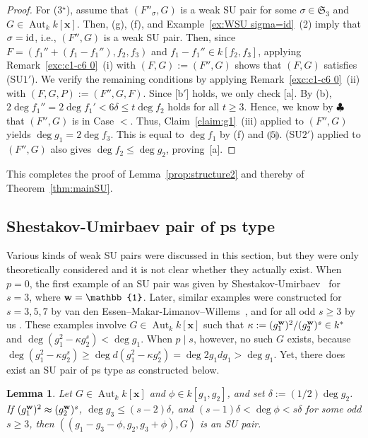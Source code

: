 \documentclass{amsart}
\theoremstyle{plain}
\newtheorem{lem}[thm]{Lemma}
\theoremstyle{definition}
\newcommand{\Aut }{\mathop{\mathrm{Aut}}\nolimits}
\newcommand{\id}{{\rm id}}
\newcommand{\x}{{\boldsymbol x}}
\newcommand{\w}{{\bf w}}
\newcommand{\kx}{k[\x]}
\newcommand{\sym}{\mathfrak{S}}
\begin{document}
\begin{proof}
For (3$^\star $), 
assume that $(F''_\sigma ,G)$ is a weak SU pair 
for some $\sigma \in \sym _3$ and $G\in \Aut _k\kx $. 
Then, 
(g), (f), and Example~\ref{ex:WSU sigma=id}~(2) 
imply that $\sigma =\id $, 
i.e., 
$(F'',G)$ is a weak SU pair. 
Then, 
since $F=(f_1''+(f_1-f_1''),f_2,f_3)$ 
and $f_1-f_1''\in k[f_2,f_3]$, 
applying Remark~\ref{exc:c1-c6 0}~(i) with $(F,G):=(F'',G)$ 
shows that $(F,G)$ satisfies (SU$1'$). 
We verify the remaining conditions by applying 
Remark~\ref{exc:c1-c6 0}~(ii) with $(F,G,P):=(F'',G,F)$. 
Since [b$'$] holds, 
we only check [a]. 
By (b), 
$2\deg f_1''=2\deg f_1'<6\delta \le t\deg f_2$ 
holds for all $t\ge 3$. 
Hence, we know by $\clubsuit $ that $(F'',G)$ is in Case $<$. 
Thus, 
Claim~\ref{claim:g1}~(iii) applied to $(F'',G)$ 
yields $\deg g_1=2\deg f_3$. 
This is equal to $\deg f_1$ 
by (f) and $\llparenthesis 5 \rrparenthesis$. 
(SU$2'$) applied to $(F'',G)$ also gives $\deg f_2\le \deg g_2$, proving~[a]. 
\end{proof}




This completes the proof of 
Lemma~\ref{prop:structure2} 
and thereby of Theorem~\ref{thm:mainSU}. 


\subsection{Shestakov-Umirbaev pair of ps type}\setcounter{equation}{0}


Various kinds of weak SU pairs were discussed in this section, 
but they were only theoretically considered 
and it is not clear whether they actually exist. 
When $p=0$, 
the first example of an SU pair was given by 
Shestakov-Umirbaev~\cite[Example 1]{SU} for $s=3$, 
where $\w =\mathbb{1}$. 
Later, similar examples were constructed for $s=3,5,7$ 
by van den Essen--Makar-Limanov--Willems~\cite{EMW}, 
and for all odd $s\ge 3$ by us \cite{typeI}. 
These examples involve $G\in \Aut _k\kx $ 
such that $\kappa :=(g_1^{\w })^2/(g_2^{\w })^s\in k^*$ 
and $\deg (g_1^2-\kappa g_2^s)<\deg g_1$. 
When $p\mid s$, 
however, 
no such $G$ exists, 
because 
$\deg (g_1^2-\kappa g_2^s)\ge \deg d(g_1^2-\kappa g_2^s)
=\deg 2g_1dg_1>\deg g_1$. 
Yet, there does exist an SU pair of ps type 
as constructed below. 


\begin{lem}\label{lem:typeI}
Let 
$G\in \Aut _k\kx $ and $\phi \in k[g_1,g_2]$, 
and set 
$\delta :=(1/2)\deg g_2$. 
If $(g_1^{\w })^2\approx (g_2^{\w })^s$, 
$\deg g_3\le (s-2)\delta $, 
and $(s-1)\delta <\deg \phi <s\delta $ 
for some odd $s\ge 3$, 
then $((g_1-g_3-\phi ,g_2,g_3+\phi ),G)$ is an SU pair. 
\end{lem}
\end{document}
